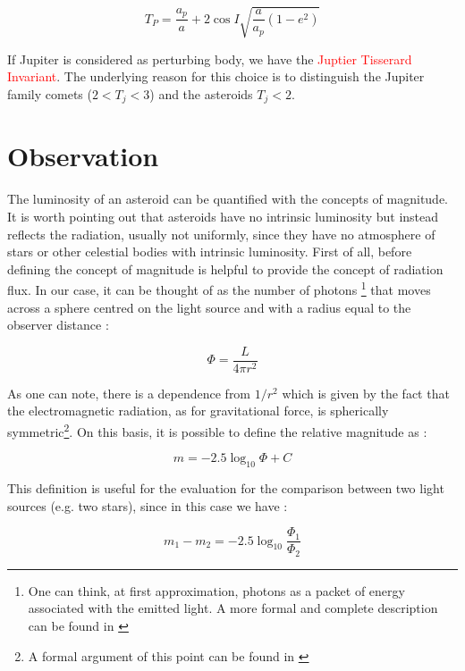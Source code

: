 \documentclass[12pt,%
               a4paper,%
               oneside,openany,%
               titlepage,%
               headinclude,footinclude,%
               BCOR5mm,%
               cleardoublepage=empty,%
               tablecaptionabove,%
               floatperchapter,
               ]{scrreprt}                 %
\begin{document}
\begin{equation}
T_{P}=\frac{a_{p}}{a}+2\cos I\sqrt{\dfrac{a}{a_{p}}(1-e^{2})}
\end{equation}

If Jupiter is considered as perturbing body, we have the \textcolor{red}{Juptier Tisserard Invariant}. The underlying reason for this choice is to distinguish the Jupiter family comets ($2<T_{j}<3$) and the asteroids $T_{j}<2$. 


\section{Observation}

The luminosity of an asteroid can be quantified with the concepts of magnitude. It is worth pointing out that asteroids have no intrinsic luminosity but instead reflects the radiation, usually not uniformly, since they have no atmosphere of stars or other celestial bodies with intrinsic luminosity. 
First of all, before defining the concept of magnitude is helpful to provide the concept of radiation flux. In our case, it can be thought of as the number of photons \footnote{One can think, at first approximation, photons as a packet of energy associated with the emitted light. A more formal and complete description can be found in \cite{feynman2018feynman} } that moves across a sphere centred on the light source and with a radius equal to the observer distance \cite{burbine2016asteroids}:

\begin{equation}
\Phi=\frac{L}{4\pi r^{2}}
\end{equation}

As one can note, there is a dependence from $1/r^{2}$ which is given by the fact that the electromagnetic radiation, as for gravitational force, is spherically symmetric\footnote{A formal argument of this point can be found in \cite{zee2013einstein}}. On this basis, it is possible to define the relative magnitude as \cite{burbine2016asteroids}:

\begin{equation}
m=-2.5\log_{10}\Phi+C
\end{equation}

This definition is useful for the evaluation for the comparison between two light sources (e.g. two stars), since in this case we have \cite{burbine2016asteroids}:

\begin{equation}
m_{1}-m_{2}=-2.5\log_{10}\frac{\Phi_{1}}{\Phi_{2}}
\end{equation}
\end{document}
